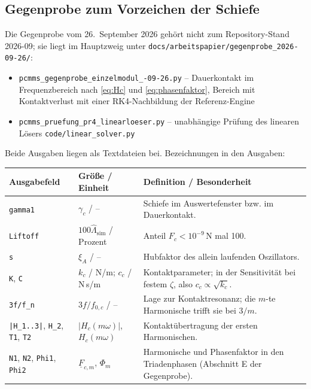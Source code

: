 \documentclass[11pt,a4paper]{article}
\begin{document}
\subsection{Gegenprobe zum Vorzeichen der Schiefe}\label{app:gegenprobe}
Die Gegenprobe vom 26.~September 2026 gehört nicht zum Repository-Stand 2026-09; sie liegt im Hauptzweig unter \texttt{docs/\allowbreak arbeitspapier/\allowbreak gegenprobe\_2026-09-26/}:
\begin{itemize}
\item \texttt{pcmms\_gegenprobe\_\allowbreak einzelmodul\_-09-26.py} -- Dauerkontakt im Frequenzbereich nach \eqref{eq:Hc} und \eqref{eq:phasenfaktor}, Bereich mit Kontaktverlust mit einer RK4-Nachbildung der Referenz-Engine
\item \texttt{pcmms\_pruefung\_\allowbreak pr4\_\allowbreak linearloeser.py} -- unabhängige Prüfung des linearen Lösers \texttt{code/\allowbreak linear\_solver.py}
\end{itemize}
Beide Ausgaben liegen als Textdateien bei. Bezeichnungen in den Ausgaben:
\begin{longtable}{@{}L{.24\textwidth}L{.24\textwidth}L{.47\textwidth}@{}}
\toprule\textbf{Ausgabefeld}&\textbf{Größe / Einheit}&\textbf{Definition / Besonderheit}\\\midrule\endhead
\texttt{gamma1}&$\gamma_c$ / --&Schiefe im Auswertefenster bzw. im Dauerkontakt.\\
\texttt{Liftoff}&$100\hat\Lambda_{\mathrm{sim}}$ / Prozent&Anteil $F_c<10^{-9}\,\mathrm N$ mal 100.\\
\texttt{s}&$\xi_A$ / --&Hubfaktor des allein laufenden Oszillators.\\
\texttt{K}, \texttt{C}&$k_c$ / N/m; $c_c$ / N\,s/m&Kontaktparameter; in der Sensitivität bei festem $\zeta$, also $c_c\propto\sqrt{k_c}$.\\
\texttt{3f/f\_n}&$3f/f_{0,c}$ / --&Lage zur Kontaktresonanz; die $m$-te Harmonische trifft sie bei $3/m$.\\
\texttt{|H\_1..3|}, \texttt{H\_2}, \texttt{T1}, \texttt{T2}&$|H_c(m\omega)|$, $H_c(m\omega)$&Kontaktübertragung der ersten Harmonischen.\\
\texttt{N1}, \texttt{N2}, \texttt{Phi1}, \texttt{Phi2}&$\underline{F}_{c,m}$, $\Phi_m$&Harmonische und Phasenfaktor in den Triadenphasen (Abschnitt E der Gegenprobe).\\
\bottomrule\end{longtable}
\end{document}
